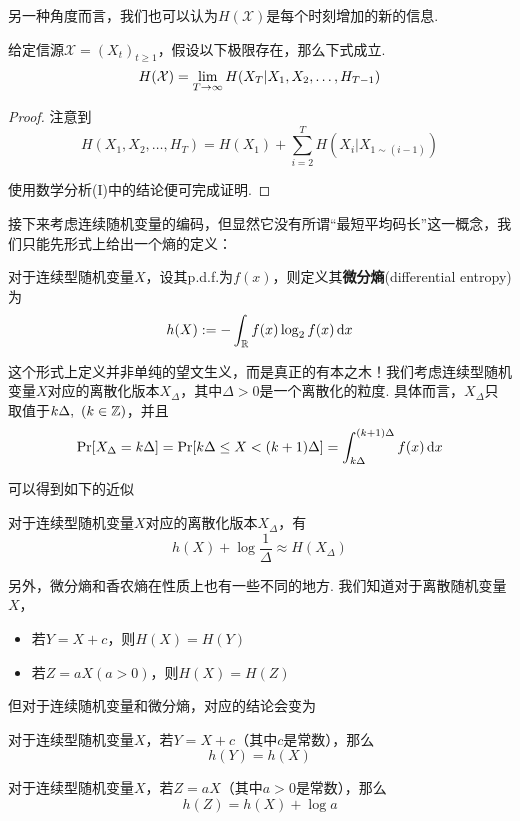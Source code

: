另一种角度而言，我们也可以认为$H(\mathcal{X})$是每个时刻增加的新的信息. 
\begin{theorem}
    给定信源$\mathcal{X}= (X_t)_{t\ge 1}$，假设以下极限存在，那么下式成立. 
    \[
    H(\mathcal{X}) = \lim_{T \rightarrow \infty} H(X_T | X_1, X_2, \dots, H_{T-1})
    \]
\end{theorem}
\begin{proof}
    注意到
    \[
    H(X_1, X_2, \dots, H_T) = H(X_1) + \sum_{i=2}^T H(X_i | X_{1 \sim (i-1)})
    \]

    使用数学分析(I)中的结论便可完成证明. 
\end{proof} 

接下来考虑连续随机变量的编码，但显然它没有所谓“最短平均码长”这一概念，我们只能先形式上给出一个熵的定义：
\begin{definition}[微分熵]
    对于连续型随机变量$X$，设其p.d.f.为$f(x)$，则定义其\textbf{微分熵}(differential entropy)为 
    \[
        h(X) := -\int_{\mathbb{R}} f(x) \log_2 f(x) \mathop{}\!\mathrm{d}x
    \]
\end{definition}

这个形式上定义并非单纯的望文生义，而是真正的有本之木！我们考虑连续型随机变量$X$对应的离散化版本$X_\Delta$，其中$\Delta > 0$是一个离散化的粒度. 具体而言，$X_\Delta$只取值于$k\Delta, \ (k \in \mathbb{Z})$，并且 
\[
\Pr[X_\Delta = k\Delta] = \Pr[k \Delta \le X < (k+1)\Delta] = \int_{k \Delta }^{(k+1) \Delta} f(x) \mathop{}\!\mathrm{d}x
\]

可以得到如下的近似 
\begin{proposition}
    对于连续型随机变量$X$对应的离散化版本$X_\Delta$，有 
    \[
    h(X) + \log \dfrac{1}{\Delta} \approx H(X_\Delta)
    \]
\end{proposition}

另外，微分熵和香农熵在性质上也有一些不同的地方. 我们知道对于离散随机变量$X$，
\begin{itemize}
    \item 若$Y = X + c$，则$H(X) = H(Y)$
    \item 若$Z = aX (a>0)$，则$H(X) = H(Z)$
\end{itemize}

但对于连续随机变量和微分熵，对应的结论会变为
\begin{proposition}
    对于连续型随机变量$X$，若$Y = X + c$（其中$c$是常数），那么
    \[
    h(Y) = h(X)
    \]
\end{proposition}
\begin{proposition}
    对于连续型随机变量$X$，若$Z = aX$（其中$a>0$是常数），那么
    \[
    h(Z) = h(X) + \log a
    \]
\end{proposition}

